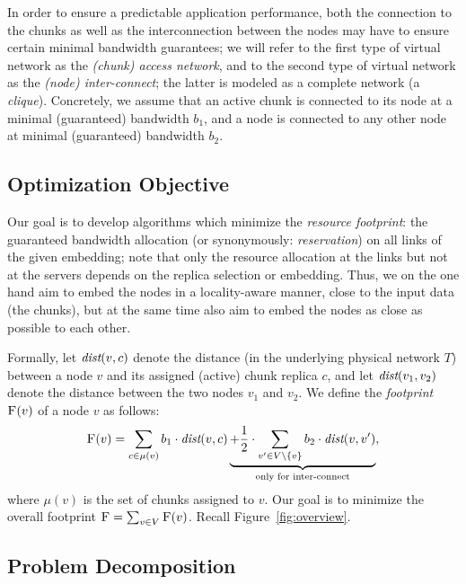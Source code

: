 \documentclass[9pt]{sigcomm-alternate}
\newcommand{\stefan}[1]{\textcolor{blue}{stefan: #1}}
\newcommand{\VirtualNodes}{\ensuremath{V}}
\newcommand{\achunk}{\ensuremath{c}}
\newcommand{\dist}{\emph{dist}}
\newcommand{\Cost}{\textsc{F}}
\newcommand{\Tree}{\ensuremath{T}}
\newcommand{\CostTrans}{\ensuremath{b_1}}
\newcommand{\CostCom}{\ensuremath{b_2}}
\begin{document}
In order to ensure a predictable application performance, both the connection to the chunks
as well as the interconnection between the nodes may have to ensure certain
minimal bandwidth guarantees; we will refer to the first type of virtual network as the \emph{(chunk) access
network}, and to the second type of virtual network as the \emph{(node) inter-connect}; the latter 
is modeled as a complete network (a \emph{clique}). Concretely, we assume that an  active chunk
is connected to its node at a minimal (guaranteed) bandwidth $\CostTrans$, and a node is connected to any other node
at minimal (guaranteed) bandwidth $\CostCom$.



\subsection{Optimization Objective}

Our goal is to develop algorithms which minimize
the \emph{resource footprint}: the guaranteed bandwidth allocation (or synonymously: \emph{reservation}) on all links of the given embedding; note that
only the resource allocation at the links but not at the servers depends on the replica selection or embedding. Thus,
we on the one hand aim to embed the nodes in a locality-aware manner, close to the input data
(the chunks), but at the same time also aim to embed the nodes as close as possible to
each other.

Formally, let $\dist(v,\achunk)$ denote the distance (in the underlying physical network $\Tree$) between a node $v$ and
its assigned (active) chunk replica $\achunk$, and let $\dist(v_1,v_2)$ denote the distance between the two nodes $v_1$ and $v_2$.
We define the \emph{footprint} $\Cost(v)$ of a node $v$ as follows:
$$
\Cost(v) = \sum_{\achunk\in \mu(v)} \CostTrans \cdot \dist(v,\achunk) \underbrace{+ \frac{1}{2} \cdot \sum_{v' \in \VirtualNodes\setminus\{v\}} \CostCom \cdot \dist(v,v')}_{\text{only for inter-connect}},
$$
\noindent where $\mu(v)$ is the set of chunks assigned to $v$. Our goal is to minimize the overall footprint
$\Cost=\sum_{v\in V} \Cost(v)$. Recall Figure~\ref{fig:overview}.


\subsection{Problem Decomposition}
\end{document}
